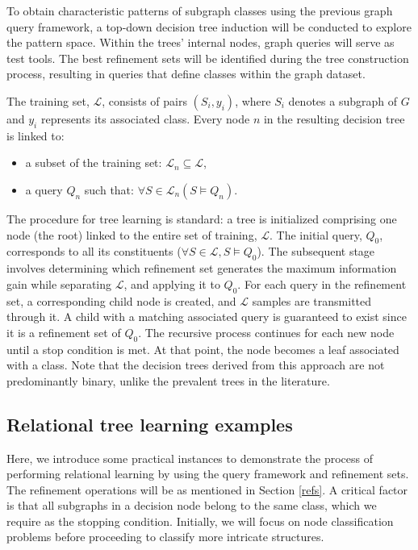 \documentclass{article}%
\begin{document}
To obtain characteristic patterns of subgraph classes using the previous graph query framework, a top-down decision tree induction will be conducted to explore the pattern space. Within the trees' internal nodes, graph queries will serve as test tools. The best refinement sets will be identified during the tree construction process, resulting in queries that define classes within the graph dataset. 

The training set, $\mathcal{L}$, consists of pairs $(S_i, y_i)$, where $S_i$ denotes a subgraph of $G$ and $y_i$ represents its associated class. Every node $n$ in the resulting decision tree is linked to:
 
\begin{itemize}
\item a subset of the training set: $\mathcal{L}_n \subseteq \mathcal{L}$, 
\item a query $Q_n$ such that: $\forall S \in \mathcal {L}_n (S \vDash Q_n)$.
\end{itemize}

The procedure for tree learning is standard: a tree is initialized comprising one node (the root) linked to the entire set of training, $\mathcal{L}$. The initial query, $ Q_0 $, corresponds to all its constituents ($\forall S \in \mathcal{L}, S \vDash Q_0$). The subsequent stage involves determining which refinement set generates the maximum information gain while separating $\mathcal{L}$, and applying it to $ Q_0 $. For each query in the refinement set, a corresponding child node is created, and $\mathcal{L}$ samples are transmitted through it. A child with a matching associated query is guaranteed to exist since it is a refinement set of $Q_0$. The recursive process continues for each new node until a stop condition is met. At that point, the node becomes a leaf associated with a class. Note that the decision trees derived from this approach are not predominantly binary, unlike the prevalent trees in the literature. 

\subsection{Relational tree learning examples}
\label{kd}

Here, we introduce some practical instances to demonstrate the process of performing relational learning by using the query framework and refinement sets. The refinement operations will be as mentioned in Section \ref{refs}. A critical factor is that all subgraphs in a decision node belong to the same class, which we require as the stopping condition. Initially, we will focus on node classification problems before proceeding to classify more intricate structures. 
\end{document}
